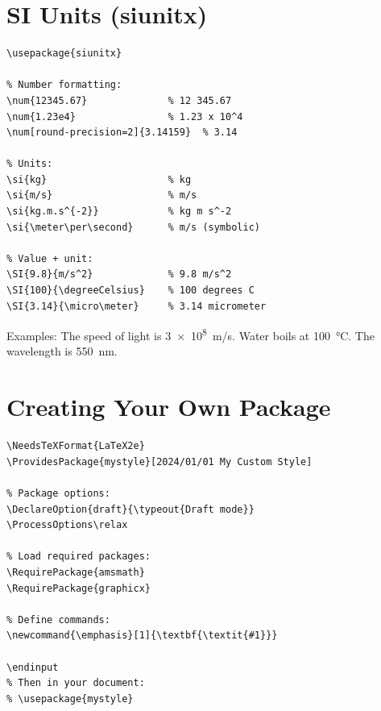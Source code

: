 \section{SI Units (siunitx)}

\begin{lstlisting}[language={[LaTeX]TeX}, caption=siunitx package]
\usepackage{siunitx}

% Number formatting:
\num{12345.67}              % 12 345.67
\num{1.23e4}                % 1.23 x 10^4
\num[round-precision=2]{3.14159}  % 3.14

% Units:
\si{kg}                     % kg
\si{m/s}                    % m/s
\si{kg.m.s^{-2}}            % kg m s^-2
\si{\meter\per\second}      % m/s (symbolic)

% Value + unit:
\SI{9.8}{m/s^2}             % 9.8 m/s^2
\SI{100}{\degreeCelsius}    % 100 degrees C
\SI{3.14}{\micro\meter}     % 3.14 micrometer
\end{lstlisting}

Examples: The speed of light is \SI{3e8}{m/s}. Water boils at \SI{100}{\degreeCelsius}. The wavelength is \SI{550}{\nano\meter}.

\section{Creating Your Own Package}

\begin{lstlisting}[language={[LaTeX]TeX}, caption=Creating a package]
% Save as mystyle.sty:
\NeedsTeXFormat{LaTeX2e}
\ProvidesPackage{mystyle}[2024/01/01 My Custom Style]

% Package options:
\DeclareOption{draft}{\typeout{Draft mode}}
\ProcessOptions\relax

% Load required packages:
\RequirePackage{amsmath}
\RequirePackage{graphicx}

% Define commands:
\newcommand{\emphasis}[1]{\textbf{\textit{#1}}}

\endinput
% Then in your document:
% \usepackage{mystyle}
\end{lstlisting}
